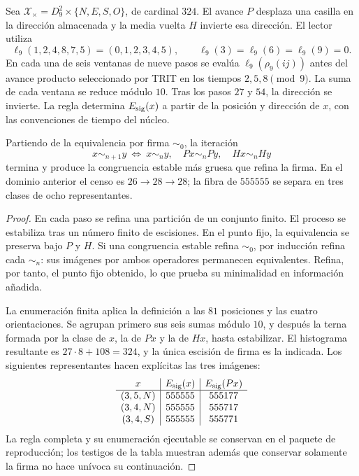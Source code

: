 \begin{definition}
\label{def:firma555}
Sea \(\mathcal X_\times=D_9^2\times\{N,E,S,O\}\), de cardinal \(324\).
El avance \(P\) desplaza una casilla en la dirección almacenada y la media
vuelta \(H\) invierte esa dirección. El lector utiliza
\[
\ell_9(1,2,4,8,7,5)=(0,1,2,3,4,5),\qquad
\ell_9(3)=\ell_9(6)=\ell_9(9)=0.
\]
En cada una de seis ventanas de nueve pasos se evalúa
\(\ell_9(\rho_9(ij))\) antes del avance producto seleccionado por TRIT en
los tiempos \(2,5,8\pmod9\). La suma de cada ventana se reduce módulo
\(10\). Tras los pasos \(27\) y \(54\), la dirección se invierte.
La regla determina \(E_{\rm sig}(x)\) a partir de la posición y dirección
de \(x\), con las convenciones de tiempo del núcleo.
\end{definition}

\begin{proposition}
\label{prop:firma555}
Partiendo de la equivalencia por firma \(\sim_0\), la iteración
\[
x\sim_{n+1}y\ \Longleftrightarrow\
x\sim_n y,\quad Px\sim_n Py,\quad Hx\sim_n Hy
\]
termina y produce la congruencia estable más gruesa que refina la firma.
En el dominio anterior el censo es \(26\to28\to28\); la fibra de
\(555555\) se separa en tres clases de ocho representantes.
\end{proposition}
\begin{proof}
En cada paso se refina una partición de un conjunto finito. El proceso se
estabiliza tras un número finito de escisiones. En el punto fijo, la
equivalencia se preserva bajo \(P\) y \(H\). Si una congruencia estable
refina \(\sim_0\), por inducción refina cada \(\sim_n\): sus imágenes
por ambos operadores permanecen equivalentes. Refina, por tanto, el punto
fijo obtenido, lo que prueba su minimalidad en información añadida.

La enumeración finita aplica la definición a las \(81\) posiciones y las
cuatro orientaciones. Se agrupan primero sus seis sumas módulo \(10\), y
después la terna formada por la clase de \(x\), la de \(Px\) y la de
\(Hx\), hasta estabilizar. El histograma resultante es
\(27\cdot8+108=324\), y la única escisión de firma es la indicada.
Los siguientes representantes hacen explícitas las tres imágenes:
\[
\begin{array}{c|c|c}
x&E_{\rm sig}(x)&E_{\rm sig}(Px)\\\hline
(3,5,N)&555555&555177\\
(3,4,N)&555555&555717\\
(3,4,S)&555555&555771
\end{array}
\]
La regla completa y su enumeración ejecutable se conservan en el paquete
de reproducción; los testigos de la tabla muestran además que conservar
solamente la firma no hace unívoca su continuación.
\end{proof}

